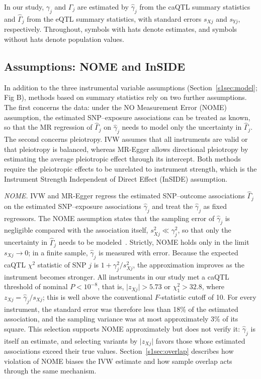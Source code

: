 \noindent In our study, $\gamma_j$ and $\Gamma_j$ are estimated by $\hat{\gamma}_j$ from the caQTL summary statistics and $\hat{\Gamma}_j$ from the eQTL summary statistics, with standard errors $s_{Xj}$ and $s_{Yj}$, respectively. Throughout, symbols with hats denote estimates, and symbols without hats denote population values.

\subsection*{Assumptions: NOME and InSIDE}
\label{s1sec:assump}

\noindent In addition to the three instrumental variable assumptions (Section~\ref{s1sec:model}; Fig B), methods based on summary statistics rely on two further assumptions. The first concerns the data: under the NO Measurement Error (NOME) assumption, the estimated SNP--exposure associations can be treated as known, so that the MR regression of $\hat{\Gamma}_j$ on $\hat{\gamma}_j$ needs to model only the uncertainty in $\hat{\Gamma}_j$. The second concerns pleiotropy. IVW assumes that all instruments are valid or that pleiotropy is balanced, whereas MR-Egger allows directional pleiotropy by estimating the average pleiotropic effect through its intercept. Both methods require the pleiotropic effects to be unrelated to instrument strength, which is the Instrument Strength Independent of Direct Effect (InSIDE) assumption.

\noindent \textit{NOME.} IVW and MR-Egger regress the estimated SNP--outcome associations $\hat{\Gamma}_j$ on the estimated SNP--exposure associations $\hat{\gamma}_j$ and treat the $\hat{\gamma}_j$ as fixed regressors. The NOME assumption states that the sampling error of $\hat{\gamma}_j$ is negligible compared with the association itself, $s_{Xj}^2\ll\gamma_j^2$, so that only the uncertainty in $\hat{\Gamma}_j$ needs to be modeled~\cite{bowden2016nome}. Strictly, NOME holds only in the limit $s_{Xj}\to0$; in a finite sample, $\hat{\gamma}_j$ is measured with error. Because the expected caQTL $\chi^2$ statistic of SNP $j$ is $1+\gamma_j^2/s_{Xj}^2$, the approximation improves as the instrument becomes stronger. All instruments in our study met a caQTL threshold of nominal $P<10^{-8}$, that is, $\lvert z_{Xj}\rvert>5.73$ or $\chi^2_1>32.8$, where $z_{Xj}=\hat{\gamma}_j/s_{Xj}$; this is well above the conventional $F$-statistic cutoff of 10. For every instrument, the standard error was therefore less than 18\% of the estimated association, and the sampling variance was at most approximately 3\% of its square. This selection supports NOME approximately but does not verify it: $\hat{\gamma}_j$ is itself an estimate, and selecting variants by $\lvert z_{Xj}\rvert$ favors those whose estimated associations exceed their true values. Section~\ref{s1sec:overlap} describes how violation of NOME biases the IVW estimate and how sample overlap acts through the same mechanism.

